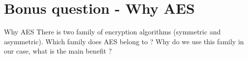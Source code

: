 \section{Bonus question - Why AES}

\begin{bonusQuestionBox}{Why AES}
    There is two family of encryption algorithms (symmetric and asymmetric). Which family does AES belong to ? Why do we use this family in our case, what is the main benefit ?
\end{bonusQuestionBox}
